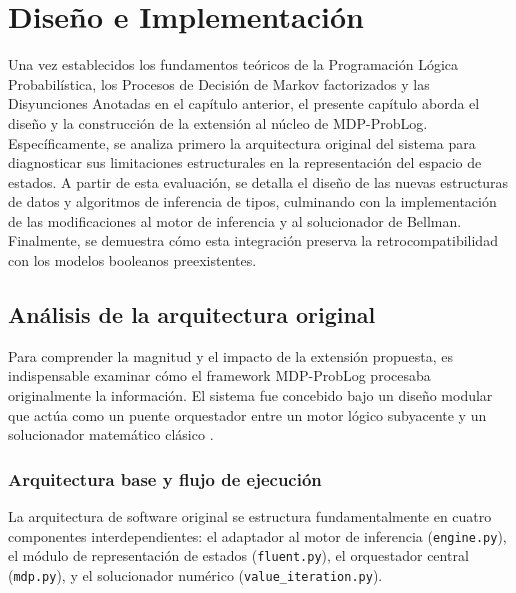 \section{Diseño e Implementación}
\label{ch:diseno-implementacion}

Una vez establecidos los fundamentos teóricos de la Programación Lógica Probabilística, los Procesos de Decisión de Markov factorizados y las Disyunciones Anotadas en el capítulo anterior, el presente capítulo aborda el diseño y la construcción de la extensión al núcleo de MDP-ProbLog. Específicamente, se analiza primero la arquitectura original del sistema para diagnosticar sus limitaciones estructurales en la representación del espacio de estados. A partir de esta evaluación, se detalla el diseño de las nuevas estructuras de datos y algoritmos de inferencia de tipos, culminando con la implementación de las modificaciones al motor de inferencia y al solucionador de Bellman. Finalmente, se demuestra cómo esta integración preserva la retrocompatibilidad con los modelos booleanos preexistentes.

\subsection{Análisis de la arquitectura original}
\label{sec:di-analisis-arquitectura}

Para comprender la magnitud y el impacto de la extensión propuesta, es indispensable examinar cómo el framework MDP-ProbLog procesaba originalmente la información. El sistema fue concebido bajo un diseño modular que actúa como un puente orquestador entre un motor lógico subyacente y un solucionador matemático clásico \cite{bueno2016mdp}.

\subsubsection{Arquitectura base y flujo de ejecución}
\label{sec:di-arquitectura-base}

La arquitectura de software original se estructura fundamentalmente en cuatro componentes interdependientes: el adaptador al motor de inferencia (\texttt{engine.py}), el módulo de representación de estados (\texttt{fluent.py}), el orquestador central (\texttt{mdp.py}), y el solucionador numérico (\texttt{value\_iteration.py}).

